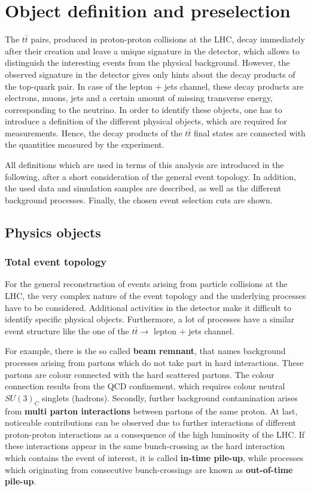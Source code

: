\chapter{Object definition and preselection}\label{ch4}


The $t\bar{t}$ pairs, produced in proton-proton collisions at the LHC, decay immediately after their creation and leave a unique signature in the detector, which allows to distinguish the interesting events from the physical background. However, the observed signature in the detector gives only hints about the decay products of the top-quark pair.
In case of the lepton + jets channel, these decay products are electrons, muons, jets and a certain amount of missing transverse energy, corresponding to the neutrino. In order to identify these objects, one has to introduce a definition of the different physical objects, which are required for measurements. Hence, the decay products of the $t\bar{t}$ final states are connected with the quantities measured by the experiment.

All definitions which are used in terms of this analysis are introduced in the following, after a short consideration of the general event topology. In addition, the used data and simulation samples are described, as well as the different background processes. Finally, the chosen event selection cuts are shown.
\section{Physics objects}
\subsection{Total event topology}

For the general reconstruction of events arising from particle collisions at the LHC, the very complex nature of the event topology and the underlying processes have to be considered.
Additional activities in the detector make it difficult to identify specific physical objects. Furthermore, a lot of processes have a similar event structure like the one of the $t\bar{t} \rightarrow$ lepton + jets channel.  


 For example, there is the so called  \textbf{beam remnant}, that names background processes arising from partons which do not take part in hard interactions. These partons are colour connected with the hard scattered partons. The colour connection results from the QCD confinement, which requires colour neutral  $SU(3)_C$ singlets (hadrons). Secondly, further background contamination arises from \textbf{multi parton interactions} between partons of the same proton. At last, noticeable contributions can be observed due to
further interactions of different proton-proton interactions as a consequence of the high luminosity of the LHC.
If these interactions appear in the same bunch-crossing  as the hard interaction which contains the event of interest, it is called \textbf{in-time pile-up}, while processes  which originating from consecutive bunch-crossings are known as \textbf{out-of-time pile-up}. 
      
